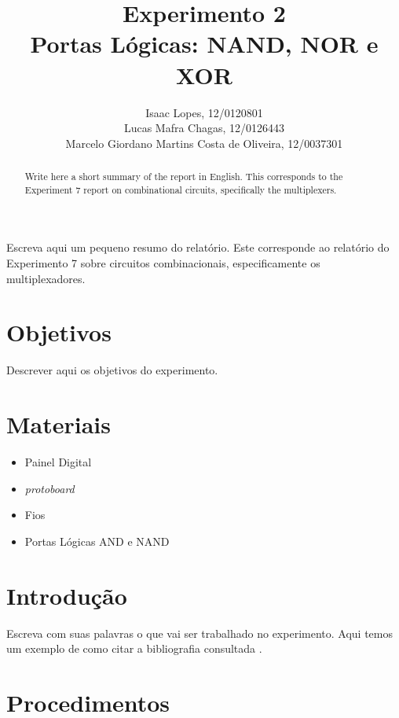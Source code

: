 \documentclass[12pt]{article}
\title{Experimento 2\\ 
	Portas Lógicas: NAND, NOR e XOR }
\author{Isaac Lopes, 12/0120801\\
	Lucas Mafra Chagas, 12/0126443 \\
	Marcelo Giordano Martins Costa de Oliveira,  12/0037301
}
\begin{document}
 

\maketitle

 \begin{abstract}
   Write here a short summary of the report in English. This corresponds to the Experiment 7 report on combinational circuits, specifically the multiplexers.
 \end{abstract}
     
 \begin{resumo} 
  Escreva aqui um pequeno resumo do relatório. Este corresponde ao relatório do Experimento 7 sobre circuitos combinacionais, especificamente os multiplexadores.
 \end{resumo}


\section{Objetivos}
\label{sec:Objetivos}

Descrever aqui os objetivos do experimento.

\section{Materiais} 
\label{sec:Materiais}

\begin{itemize}
    \item Painel Digital
    
    \item \textit{protoboard}
    
    \item Fios
    
    \item Portas Lógicas AND e NAND
    
\end{itemize}


\section{Introdução}
\label{sec:Introducao}

Escreva com suas palavras o que vai ser trabalhado no experimento. Aqui temos um exemplo de como citar a bibliografia consultada \cite{boulic:91} \cite{smith:99}.

\section{Procedimentos}
\label{sec:Procedimentos}
\end{document}
